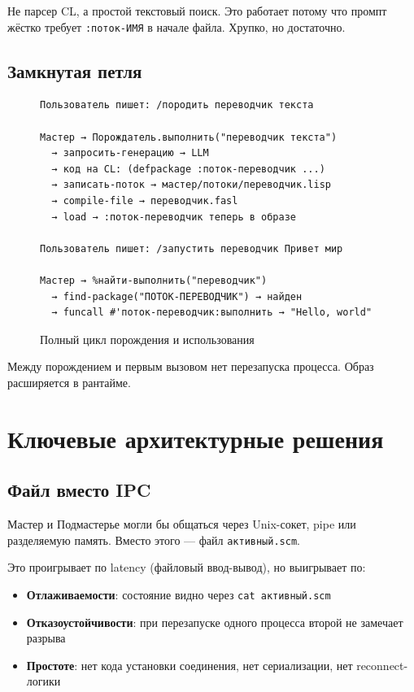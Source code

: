 \documentclass[11pt,a4paper]{article}
\begin{document}
Не парсер CL, а простой текстовый поиск. Это работает потому что промпт жёстко требует \texttt{:поток-ИМЯ} в начале файла. Хрупко, но достаточно.

\subsection{Замкнутая петля}

\begin{figure}[H]\centering\small\begin{verbatim}
Пользователь пишет: /породить переводчик текста

Мастер → Порождатель.выполнить("переводчик текста")
  → запросить-генерацию → LLM
  → код на CL: (defpackage :поток-переводчик ...)
  → записать-поток → мастер/потоки/переводчик.lisp
  → compile-file → переводчик.fasl
  → load → :поток-переводчик теперь в образе

Пользователь пишет: /запустить переводчик Привет мир

Мастер → %найти-выполнить("переводчик")
  → find-package("ПОТОК-ПЕРЕВОДЧИК") → найден
  → funcall #'поток-переводчик:выполнить → "Hello, world"
\end{verbatim}
\caption{Полный цикл порождения и использования}
\end{figure}

Между порождением и первым вызовом нет перезапуска процесса. Образ расширяется в рантайме.

\section{Ключевые архитектурные решения}
\label{sec:decisions}

\subsection{Файл вместо IPC}

Мастер и Подмастерье могли бы общаться через Unix-сокет, pipe или разделяемую память. Вместо этого — файл \texttt{активный.scm}.

Это проигрывает по latency (файловый ввод-вывод), но выигрывает по:
\begin{itemize}[noitemsep]
  \item \textbf{Отлаживаемости}: состояние видно через \texttt{cat активный.scm}
  \item \textbf{Отказоустойчивости}: при перезапуске одного процесса второй не замечает разрыва
  \item \textbf{Простоте}: нет кода установки соединения, нет сериализации, нет reconnect-логики
\end{itemize}
\end{document}
